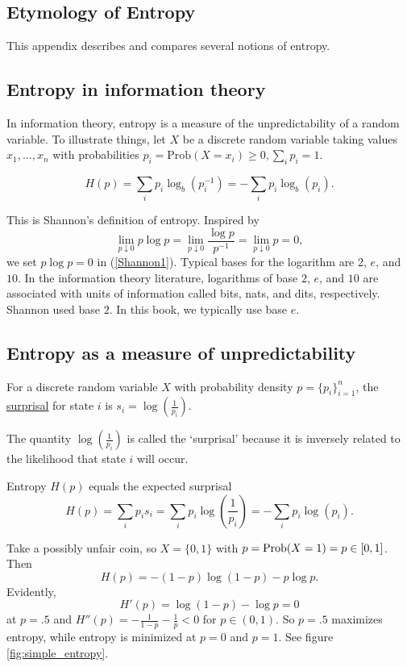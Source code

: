 \begin{subappendices}
\section{Etymology of Entropy\label{app:etymology_entropy}}
This appendix describes and compares several notions of entropy.
\subsection{Entropy in information theory\label{sec:Shannon1}}

In information theory,  entropy is a measure of the unpredictability of a random variable. To illustrate
things, let $X$ be a discrete random variable taking values $x_1, \ldots, x_n$
with probabilities $p_i = \textrm{Prob}(X = x_i) \geq 0, \sum_i p_i =1$.
\begin{definition}
\begin{equation}\label{Shannon1} H(p) = \sum_i p_i \log_b (p_i^{-1}) = - \sum_i p_i \log_b (p_i) .\end{equation}
\end{definition}
\noindent This is Shannon's definition of entropy.
Inspired by
\[ \lim_{p\downarrow 0} p \log p = \lim_{p \downarrow 0} \frac{\log p}{p^{-1}} = \lim_{p \downarrow 0}p = 0, \]
we set $p \log p = 0$ in (\ref{Shannon1}).
Typical bases for the logarithm are $2$,  $e$, and $10$.
In the information theory literature, logarithms of base $2$, $e$, and $10$ are associated with units of information
called bits, nats, and dits, respectively. Shannon used base $2$.  In this book, we  typically use base $e$.

\subsection{Entropy as a measure of unpredictability}


\begin{definition}
For a discrete random variable $X$ with probability density $p = \{p_i\}_{i=1}^n$,   the \underline{surprisal}
for state $i$ is  $ s_i = \log\left(\frac{1}{p_i}\right) $.
\end{definition}

\noindent The quantity $ \log\left(\frac{1}{p_i}\right) $ is called the `surprisal' because it is inversely related to the likelihood that state
$i$ will occur.
\begin{remark}
Entropy $H(p)$ equals the expected surprisal
\[ H(p) = \sum_i p_i s_i = \sum_i p_i \log\left(\frac{1}{p_i} \right) = -  \sum_i p_i \log\left(p_i \right).\]
\end{remark}
\begin{example}
Take a possibly unfair coin, so $X = \{0,1\}$ with $p = {\rm Prob}(X=1) = p \in [0,1]$.
Then
\[ H(p) = -(1-p)\log (1-p) - p \log p. \]
Evidently,
\[ H'(p) = \log(1-p) - \log p = 0 \]
at $p=.5$ and $H''(p) = -\frac{1}{1-p} -\frac{1}{p} < 0$ for $p\in (0,1)$.
So $p=.5$ maximizes entropy, while entropy is minimized at $p=0$ and $p=1$.
See figure \ref{fig:simple_entropy}.
\end{example}







\end{subappendices}
